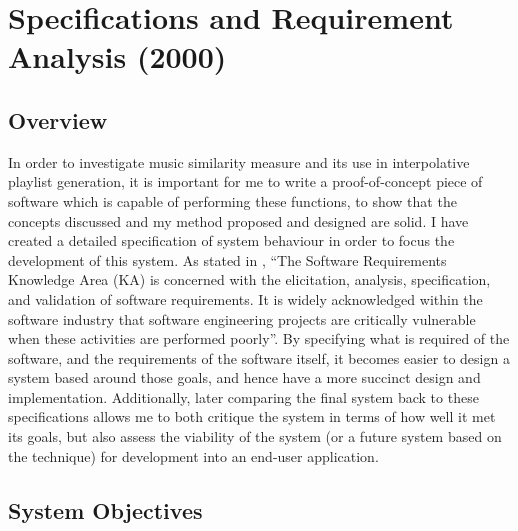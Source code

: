 %
%
\newcommand{\objective}[1]{\begin{itemize}
	\item \textbf{#1}
\end{itemize}}
\chapter{Specifications and Requirement Analysis (2000)}
\section{Overview}
In order to investigate music similarity measure and its use in interpolative playlist generation, it is important for me to write a proof-of-concept piece of software which is capable of performing these functions, to show that the concepts discussed and my method proposed and designed are solid.
I have created a detailed specification of system behaviour in order to focus the development of this system. As stated in \citet{Bourque2004}, ``The Software Requirements Knowledge Area (KA) is concerned with the elicitation, analysis, specification, and validation of software requirements. It is widely acknowledged within the software industry that software engineering projects are critically vulnerable when these activities are performed poorly''. By specifying what is required of the software, and the requirements of the software itself, it becomes easier to design a system based around those goals, and hence have a more succinct design and implementation. Additionally, later comparing the final system back to these specifications allows me to both critique the system in terms of how well it met its goals, but also assess the viability of the system (or a future system based on the technique) for development into an end-user application.
\section{System Objectives}
